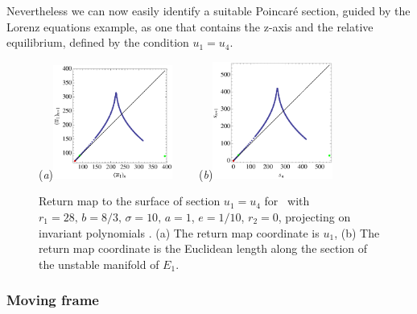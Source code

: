 Nevertheless we can now easily identify a suitable Poincar\'e section, guided
by the Lorenz equations example, as one that contains the z-axis and the relative equilibrium,
defined by the condition $u_1=u_4$.

\begin{figure}[ht]
\begin{center}
  (\textit{a})\includegraphics[width=0.35\textwidth]{../figs/CLEipRMu1.eps}
 ~~~~(\textit{b})\includegraphics[width=0.35\textwidth]{../figs/CLEipRM.eps}
\end{center}
\caption[\Poincare return map for Complex Lorenz equations, using invariant polynomials]{Return map to the \Poincare
surface of section $u_1=u_4$ for \CLe\ with $r_1=28,\, b=8/3,\, \sigma=10,\, a=1$, $e=1/10$, $r_2=0$,
projecting on invariant polynomials . (a) The return map coordinate is
$u_1$, (b) The return map coordinate is the Euclidean
length along the \Poincare section of the unstable manifold of $E_1$.
    }
\label{fig:CLEipRM}
\end{figure}

\subsubsection{Moving frame}
\label{sec:CLeMF}


